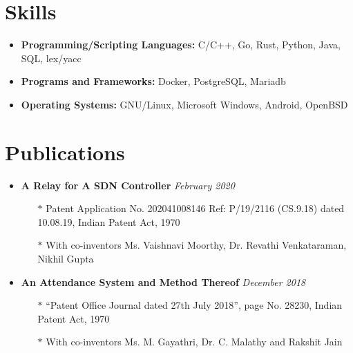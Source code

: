 \documentclass[10pt,a4paper]{article}
\begin{document}
\section{{\faCogs} Skills}
	\begin{itemize}[noitemsep,nolistsep]
		\item{\textbf{Programming/Scripting Languages:} C/C++, Go, Rust, Python, Java, SQL, lex/yacc}
		\item{\textbf{Programs and Frameworks:} Docker, PostgreSQL, Mariadb}
		\item{\textbf{Operating Systems:} GNU/Linux, Microsoft Windows, Android, OpenBSD}
	\end{itemize}


\section{{\faNewspaperO} Publications}
	\begin{itemize}[noitemsep,nolistsep]
		\item{\textbf{A Relay for A SDN Controller}} \hfill \textit{February 2020}
			\begin{itemize}[leftmargin=*]
				\setlength\itemsep{-0.25em}
				\item[$\ast$]{Patent Application No. 202041008146 Ref: P/19/2116 (CS.9.18) dated 10.08.19, Indian Patent Act, 1970}
				\item[$\ast$]{With co-inventors Ms. Vaishnavi Moorthy, Dr. Revathi Venkataraman, Nikhil Gupta}
			\end{itemize}
		\item{\textbf{An Attendance System and Method Thereof}} \hfill \textit{December 2018}
			\begin{itemize}[leftmargin=*]
				\setlength\itemsep{-0.25em}
				\item[$\ast$]{``Patent Office Journal dated 27th July 2018'', page No. 28230, Indian Patent Act, 1970}
				\item[$\ast$]{With co-inventors Ms. M. Gayathri, Dr. C. Malathy and Rakshit Jain}
			\end{itemize}
	\end{itemize}
\end{document}
